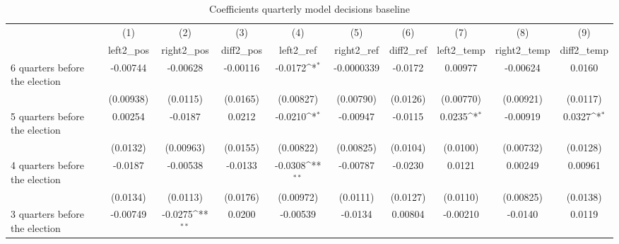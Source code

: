 \begin{table}[htbp]\centering
\def\sym#1{\ifmmode^{#1}\else\(^{#1}\)\fi}
\caption{Coefficients quarterly model decisions baseline}
\begin{tabular}{l*{9}{c}}
\hline\hline
                    &\multicolumn{1}{c}{(1)}&\multicolumn{1}{c}{(2)}&\multicolumn{1}{c}{(3)}&\multicolumn{1}{c}{(4)}&\multicolumn{1}{c}{(5)}&\multicolumn{1}{c}{(6)}&\multicolumn{1}{c}{(7)}&\multicolumn{1}{c}{(8)}&\multicolumn{1}{c}{(9)}\\
                    &\multicolumn{1}{c}{left2\_pos}&\multicolumn{1}{c}{right2\_pos}&\multicolumn{1}{c}{diff2\_pos}&\multicolumn{1}{c}{left2\_ref}&\multicolumn{1}{c}{right2\_ref}&\multicolumn{1}{c}{diff2\_ref}&\multicolumn{1}{c}{left2\_temp}&\multicolumn{1}{c}{right2\_temp}&\multicolumn{1}{c}{diff2\_temp}\\
\hline
 6 quarters before the election&    -0.00744         &    -0.00628         &    -0.00116         &     -0.0172\sym{*}  &  -0.0000339         &     -0.0172         &     0.00977         &    -0.00624         &      0.0160         \\
                    &   (0.00938)         &    (0.0115)         &    (0.0165)         &   (0.00827)         &   (0.00790)         &    (0.0126)         &   (0.00770)         &   (0.00921)         &    (0.0117)         \\
[1em]
 5 quarters before the election&     0.00254         &     -0.0187         &      0.0212         &     -0.0210\sym{*}  &    -0.00947         &     -0.0115         &      0.0235\sym{*}  &    -0.00919         &      0.0327\sym{*}  \\
                    &    (0.0132)         &   (0.00963)         &    (0.0155)         &   (0.00822)         &   (0.00825)         &    (0.0104)         &    (0.0100)         &   (0.00732)         &    (0.0128)         \\
[1em]
 4 quarters before the election&     -0.0187         &    -0.00538         &     -0.0133         &     -0.0308\sym{**} &    -0.00787         &     -0.0230         &      0.0121         &     0.00249         &     0.00961         \\
                    &    (0.0134)         &    (0.0113)         &    (0.0176)         &   (0.00972)         &    (0.0111)         &    (0.0127)         &    (0.0110)         &   (0.00825)         &    (0.0138)         \\
[1em]
 3 quarters before the election&    -0.00749         &     -0.0275\sym{**} &      0.0200         &    -0.00539         &     -0.0134         &     0.00804         &    -0.00210         &     -0.0140         &      0.0119         \\

\end{tabular}
\end{table}
